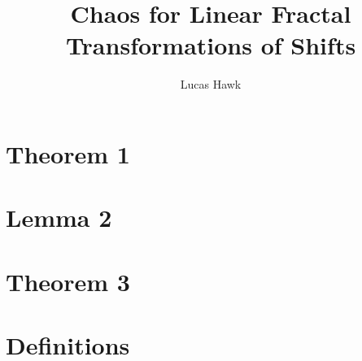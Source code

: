 \documentclass{article}
\title{Chaos for Linear Fractal Transformations of Shifts}
\author{Lucas Hawk}
\theoremstyle{plain}
\theoremstyle{definition}
\begin{document}
\maketitle

\section{Theorem 1}


\setcounter{lemma}{1}
\section{Lemma 2}


\setcounter{theorem}{2}
\section{Theorem 3}


\section{Definitions}

\end{document}
